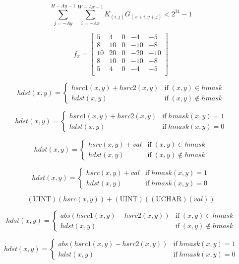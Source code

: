 \documentclass{article}
\begin{document}
{\[ \sum^{H-Ay-1}_{j=-Ay}\sum^{W-Ax-1}_{i=-Ax}K_{(i,j)}G_{(x+i,y+j)} < 2^{31}-1 \]
\pagebreak

\[ f_{x} = \left[ \begin{array}{ccccc} 5 & 4 & 0 & -4 & -5 \\ 8 & 10 & 0 & -10 & -8 \\ 10 & 20 & 0 & -20 & -10 \\ 8 & 10 & 0 & -10 & -8 \\ 5 & 4 & 0 & -4 & -5 \\ \end{array} \right] \]
\pagebreak

\[ hdst(x,y) = \left\{ \begin{array}{ll} hsrc1(x,y) + hsrc2(x,y) & \mathrm{if} \; (x,y) \in hmask \\ hdst(x,y) & \mathrm{if} \; (x,y) \notin hmask \end{array} \right. \]
\pagebreak

\[hdst(x,y) = \left\{ \begin{array}{ll} hsrc1(x,y) + hsrc2(x,y) & \mathrm{if} \; hmask(x,y) = 1 \\ hdst(x,y) & \mathrm{if} \; hmask(x,y) = 0 \end{array} \right. \]
\pagebreak

\[ hdst(x,y) = \left\{ \begin{array}{ll} hsrc(x,y) + val & \mathrm{if} \; (x,y) \in hmask \\ hdst(x,y) & \mathrm{if} \; (x,y) \notin hmask \end{array} \right. \]
\pagebreak

\[hdst(x,y) = \left\{ \begin{array}{ll} hsrc(x,y) + val & \mathrm{if} \; hmask(x,y) = 1 \\ hdst(x,y) & \mathrm{if} \; hmask(x,y) = 0 \end{array} \right. \]
\pagebreak

\[ ( \mathrm{UINT} )(hsrc(x, y) ) + ( \mathrm{UINT} )( ( \mathrm{UCHAR} )( val ) ) \]
\pagebreak

\[ hdst(x,y) = \left\{ \begin{array}{ll} abs( hsrc1(x,y) - hsrc2(x,y) ) & \mathrm{if} \; (x,y) \in hmask \\ hdst(x,y) & \mathrm{if} \; (x,y) \notin hmask \end{array} \right. \]
\pagebreak

\[hdst(x,y) = \left\{ \begin{array}{ll} abs( hsrc1(x,y) - hsrc2(x,y) ) & \mathrm{if} \; hmask(x,y) = 1 \\ hdst(x,y) & \mathrm{if} \; hmask(x,y) = 0 \end{array} \right. \]
\pagebreak

}
\end{document}
